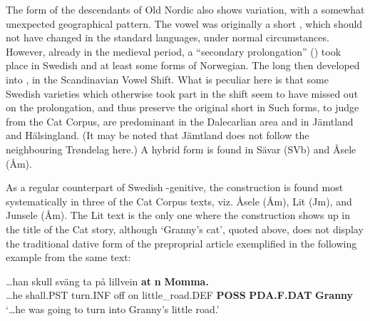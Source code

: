 {%
The form of the descendants of Old Nordic  also shows variation, with a somewhat unexpected geographical pattern. The vowel was originally a short , which should not have changed in the standard languages, under normal circumstances. However, already in the medieval period, a “secondary prolongation” (\citet[1204]{Hellquist1922}) took place in Swedish and at least some forms of Norwegian. The long  then developed into , in the Scandinavian Vowel Shift. What is peculiar here is that some Swedish varieties which otherwise took part in the   shift seem to have missed out on the prolongation, and thus preserve the original short in Such forms, to judge from the Cat Corpus, are predominant in the Dalecarlian area and in Jämtland and Hälsingland. (It may be noted that Jämtland does not follow the neighbouring Trøndelag here.) A hybrid form  is found in Sävar (SVb) and Åsele (Åm). 


As a regular counterpart of Swedish -genitive, the  construction is\textit{ }found most systematically in three of the Cat Corpus texts, viz. Åsele (Åm), Lit (Jm), and Junsele (Åm). The Lit text is the only one where the  construction shows up in the title of the Cat story, although ‘Granny’s cat’, quoted above, does not display the traditional dative form  of the preproprial article exemplified in the following example from the same text:


\ea\label{}
\gll …han  skull  sväng  ta  på  lillvein  \textbf{at} \textbf{n} \textbf{Momma.}\\
…he  shall.PST  turn.INF  off  on  little\_road.DEF  \textbf{POSS} \textbf{PDA.F.DAT} \textbf{Granny}\\
\glt ‘…he was going to turn into Granny’s little road.’
\z

}
